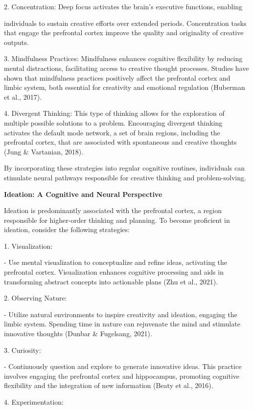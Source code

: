 \documentclass[
]{article}
\begin{document}
2. Concentration: Deep focus activates the brain's executive functions,
enabling

individuals to sustain creative efforts over extended periods.
Concentration tasks that engage the prefrontal cortex improve the
quality and originality of creative outputs.

3. Mindfulness Practices: Mindfulness enhances cognitive flexibility by
reducing mental distractions, facilitating access to creative thought
processes. Studies have shown that mindfulness practices positively
affect the prefrontal cortex and limbic system, both essential for
creativity and emotional regulation (Huberman et al., 2017).

4. Divergent Thinking: This type of thinking allows for the exploration
of multiple possible solutions to a problem. Encouraging divergent
thinking activates the default mode network, a set of brain regions,
including the prefrontal cortex, that are associated with spontaneous
and creative thoughts (Jung \& Vartanian, 2018).

By incorporating these strategies into regular cognitive routines,
individuals can stimulate neural pathways responsible for creative
thinking and problem-solving.

\textbf{Ideation: A Cognitive and Neural Perspective}

Ideation is predominantly associated with the prefrontal cortex, a
region responsible for higher-order thinking and planning. To become
proficient in ideation, consider the following strategies:

1. Visualization:

- Use mental visualization to conceptualize and refine ideas, activating
the prefrontal cortex. Visualization enhances cognitive processing and
aids in transforming abstract concepts into actionable plans (Zhu et
al., 2021).

2. Observing Nature:

- Utilize natural environments to inspire creativity and ideation,
engaging the limbic system. Spending time in nature can rejuvenate the
mind and stimulate innovative thoughts (Dunbar \& Fugelsang, 2021).

3. Curiosity:

- Continuously question and explore to generate innovative ideas. This
practice involves engaging the prefrontal cortex and hippocampus,
promoting cognitive flexibility and the integration of new information
(Beaty et al., 2016).

4. Experimentation:
\end{document}
